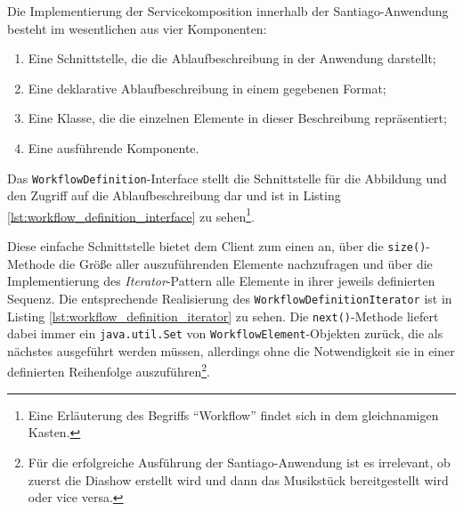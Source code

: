   Die Implementierung der Servicekomposition innerhalb der Santiago-Anwendung besteht im wesentlichen aus vier Komponenten:
  
  \begin{enumerate}
    \item Eine Schnittstelle, die die Ablaufbeschreibung in der Anwendung darstellt;
    \item Eine deklarative Ablaufbeschreibung in einem gegebenen Format;
    \item Eine Klasse, die die einzelnen Elemente in dieser Beschreibung repräsentiert;
    \item Eine ausführende Komponente.
  \end{enumerate}
  
  Das \verb!WorkflowDefinition!-Interface stellt die Schnittstelle für die Abbildung und den Zugriff auf die Ablaufbeschreibung dar und ist in Listing \ref{lst:workflow_definition_interface} zu sehen\footnote{Eine Erläuterung des Begriffs "`Workflow"' findet sich in dem gleichnamigen Kasten.}.



  Diese einfache Schnittstelle bietet dem Client zum einen an, über die \verb!size()!-Methode die Größe aller auszuführenden Elemente nachzufragen und über die Implementierung des \emph{Iterator}-Pattern \citep[S. 257]{design_patterns} alle Elemente in ihrer jeweils definierten Sequenz. Die entsprechende Realisierung des \verb!WorkflowDefinitionIterator! ist in Listing \ref{lst:workflow_definition_iterator} zu sehen. Die \verb!next()!-Methode liefert dabei immer ein \verb!java.util.Set! von \verb!WorkflowElement!-Objekten zurück, die als nächstes ausgeführt werden müssen, allerdings ohne die Notwendigkeit sie in einer definierten Reihenfolge auszuführen\footnote{Für die erfolgreiche Ausführung der Santiago-Anwendung ist es irrelevant, ob zuerst die Diashow erstellt wird und dann das Musikstück bereitgestellt wird oder vice versa.}.




